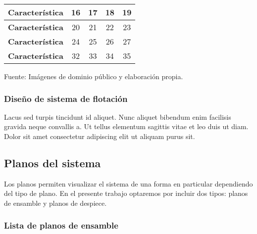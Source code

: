 \begin{mytable}[H]
\begin{tabular}{l|c|c|c|c|}
{\begin{minipage}{\myforthmaxsizeofcontenttable}
				\textbf{Característica}
			\end{minipage}
		}
		&
		16
		& 17         & 18         & 19         \\ \hline
		\multicolumn{1}{|l|}{
			\begin{minipage}{\myforthmaxsizeofcontenttable}			
				\textbf{Característica}
			\end{minipage}
		} & 20                                                                    & 21         & 22         & 23         \\ \hline
		\multicolumn{1}{|l|}{\textbf{Característica}}              & 24                                                                    & 25         & 26         & 27         \\ \hline
		\multicolumn{1}{|l|}{\textbf{Característica}}           & 32                                                                    & 33         & 34         & 35         \\ \hline
	\end{tabular}
	\begin{flushleft}	
		Fuente: Imágenes de dominio público y elaboración propia.
	\end{flushleft}
\end{mytable}

\subsubsection{Diseño de sistema de flotación}

Lacus sed turpis tincidunt id aliquet. Nunc aliquet bibendum enim facilisis gravida neque convallis a. Ut tellus elementum sagittis vitae et leo duis ut diam. Dolor sit amet consectetur adipiscing elit ut aliquam purus sit. 



\subsection{Planos del sistema}
\label{ssec:planos del sistema}

Los planos permiten visualizar el sistema de una forma en particular dependiendo del tipo de plano. En el presente trabajo optaremos por incluir dos tipos: planos de ensamble y planos de despiece.

\subsubsection{Lista de planos de ensamble}

